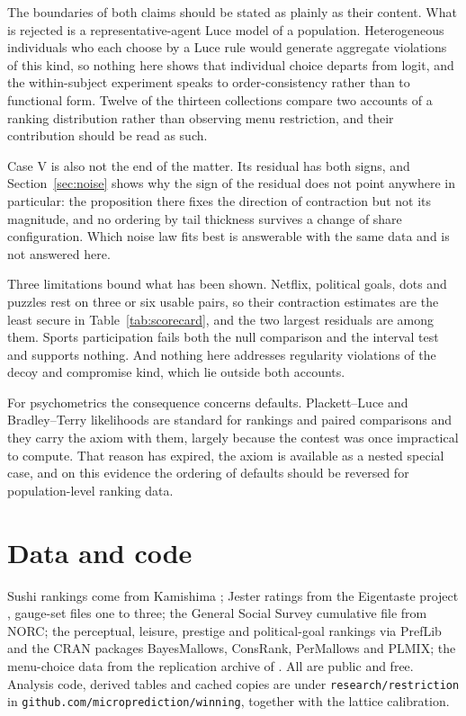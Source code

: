 \documentclass[11pt]{article}
\begin{document}
The boundaries of both claims should be stated as plainly as their content. What
is rejected is a representative-agent Luce model of a population.
Heterogeneous individuals who each choose by a Luce rule would generate aggregate
violations of this kind, so nothing here shows that individual choice departs from
logit, and the within-subject experiment speaks to order-consistency rather than to
functional form. Twelve of the thirteen collections compare two accounts of a ranking
distribution rather than observing menu restriction, and their contribution should be
read as such.

Case V is also not the end of the matter. Its residual has both signs, and
Section~\ref{sec:noise} shows why the sign of the residual does not point anywhere in
particular: the proposition there fixes the direction of contraction but not its
magnitude, and no ordering by tail thickness survives a change of share
configuration. Which noise law fits best is answerable with the same data and is not
answered here.

Three limitations bound what has been shown. Netflix, political goals, dots and
puzzles rest on three or six usable pairs, so their contraction estimates are the
least secure in Table~\ref{tab:scorecard}, and the two largest residuals are among
them. Sports participation fails both the null comparison and the interval test and
supports nothing. And nothing here addresses regularity violations of the decoy and
compromise kind, which lie outside both accounts.

For psychometrics the consequence concerns defaults. Plackett--Luce and
Bradley--Terry likelihoods are standard for rankings and paired comparisons and
they carry the axiom with them, largely because the contest was once impractical to
compute. That reason has expired, the axiom is available as a nested special case,
and on this evidence the ordering of defaults should be reversed for
population-level ranking data.

\section*{Data and code}

Sushi rankings come from Kamishima \cite{kamishima2003}; Jester ratings from the
Eigentaste project \cite{goldberg2001}, gauge-set files one to three; the General
Social Survey cumulative file from NORC; the perceptual, leisure, prestige and
political-goal rankings via PrefLib \cite{mattei2013} and the CRAN packages
BayesMallows, ConsRank, PerMallows and PLMIX; the menu-choice data from the
replication archive of \cite{costagomes2022}. All are public and free. Analysis
code, derived tables and cached copies are under \texttt{research/restriction} in
\texttt{github.com/microprediction/winning}, together with the lattice calibration.
\end{document}
